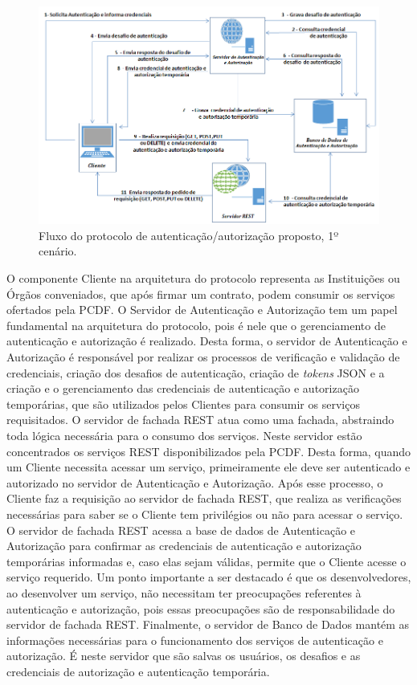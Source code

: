\begin{figure}[!htb]
    \centering
    \includegraphics[width=1.0\textwidth]{arquitetura_protocolo.png}
    \caption{Fluxo do protocolo de autenticação/autorização proposto, 1º cenário.}
    \label{fig:arquiteturaprotocolo}
\end{figure}

O componente Cliente na arquitetura do protocolo representa as Instituições ou Órgãos conveniados, que após firmar um contrato, podem consumir os serviços ofertados pela PCDF.
O Servidor de Autenticação e Autorização tem um papel fundamental na arquitetura do protocolo, pois é nele que o gerenciamento de autenticação e autorização é realizado. Desta forma, o servidor de Autenticação e Autorização é responsável por realizar os processos de verificação e validação de credenciais, criação dos desafios de autenticação, criação de \emph{tokens} JSON e a criação e o gerenciamento das credenciais de autenticação e autorização temporárias, que são utilizados pelos Clientes para consumir os serviços requisitados.
O servidor de fachada REST atua como uma fachada, abstraindo toda lógica necessária para o consumo dos serviços. Neste servidor estão concentrados os serviços REST disponibilizados pela PCDF. Desta forma, quando um Cliente necessita acessar um serviço, primeiramente ele deve ser autenticado e autorizado no servidor de Autenticação e Autorização. Após esse processo, o Cliente faz a requisição ao servidor de fachada REST, que realiza as verificações necessárias para saber se o Cliente tem privilégios ou não para acessar o serviço. O servidor de fachada REST acessa a base de dados de Autenticação e Autorização para confirmar as credenciais de autenticação e autorização temporárias informadas e, caso elas sejam válidas, permite que o Cliente acesse o serviço requerido. Um ponto importante a ser destacado é que os desenvolvedores, ao desenvolver um serviço, não necessitam ter preocupações referentes à autenticação e autorização, pois essas preocupações são de responsabilidade do servidor de fachada REST. Finalmente, o servidor de Banco de Dados mantém as informações necessárias para o funcionamento dos serviços de autenticação e autorização. É neste servidor que são salvas os usuários, os desafios e as credenciais de autorização e autenticação temporária.


